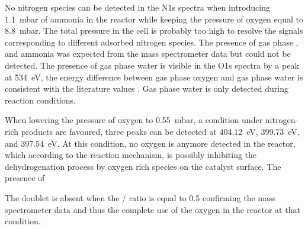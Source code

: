 No nitrogen species can be detected in the N1s spectra when introducing \qty{1.1}{\milli\bar} of ammonia in the reactor while keeping the pressure of oxygen equal to \qty{8.8}{\milli\bar}.
The total pressure in the cell is probably too high to resolve the signals corresponding to different adsorbed nitrogen species.
The presence of gas phase , and ammonia was expected from the mass spectrometer data but could not be detected.
The presence of gas phase water is visible in the O1s spectra by a peak at \qty{534}{\eV}, the energy difference between gas phase oxygen and gas phase water is consistent with the literature values \parencite{Linford2019, Avval2022}.
Gas phase water is only detected during reaction conditions.


When lowering the pressure of oxygen to \qty{0.55}{\milli\bar}, a condition under nitrogen-rich products are favoured, three peaks can be detected at \qty{404.12}{\eV}, \qty{399.73}{\eV}, and \qty{397.54}{\eV}.
At this condition, no oxygen is anymore detected in the reactor, which according to the reaction mechanism, is possibly inhibiting the dehydrogenation process by oxygen rich species on the catalyst surface.
The presence of 


The doublet is absent when the / ratio is equal to 0.5 confirming the mass spectrometer data and thus the complete use of the oxygen in the reactor at that condition.


